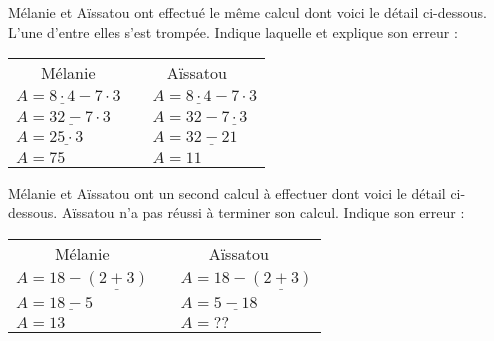 \begin{activite}

 \begin{partie}
Mélanie et Aïssatou ont effectué le même calcul dont voici le détail ci-dessous. L'une d'entre elles s'est trompée. Indique laquelle et explique son erreur :

\vspace{1em}

\begin{center}
 \begin{tabularx}{.6\linewidth}{X|cX}
  \multicolumn{1}{c|}{Mélanie} & \multicolumn{2}{c}{Aïssatou} \\
  $A = \underline{8 \cdot 4} - 7 \cdot 3$ && $A = \underline{8 \cdot 4} - 7 \cdot 3$ \\
  $A = \underline{32 - 7} \cdot 3$ && $A = 32 - \underline{7 \cdot 3}$ \\
  $A = \underline{25 \cdot 3}$ && $A = \underline{32 - 21}$ \\
  $A = 75$ && $A = 11$ \\
  \end{tabularx}
\end{center}

\end{partie}


\begin{partie}
Mélanie et Aïssatou ont un second calcul à effectuer dont voici le détail ci-dessous. Aïssatou n'a pas réussi à terminer son calcul. Indique son erreur :

\vspace{1em}

\begin{center}
 \begin{tabularx}{.6\linewidth}{X|cX}
  \multicolumn{1}{c|}{Mélanie} & \multicolumn{2}{c}{Aïssatou} \\
  $A = 18 - \underline{(2 + 3)}$ && $A = 18 - \underline{(2 + 3)}$ \\
  $A = \underline{18 - 5}$ && $A = \underline{5 - 18}$ \\
  $A = 13$ && $A = ??$ \\
  \end{tabularx}
\end{center}

\end{partie}

\end{activite}



